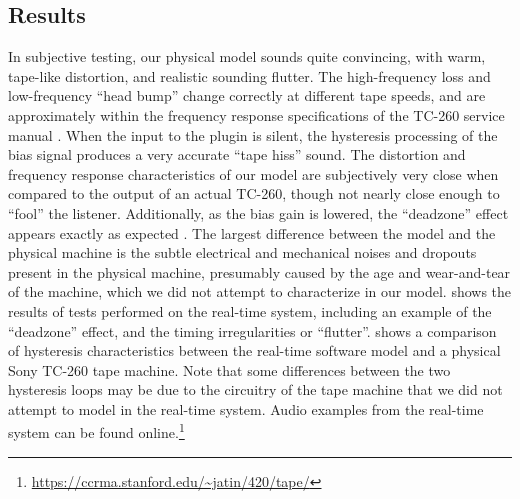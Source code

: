 \documentclass[twoside,a4paper]{article}
\begin{document}
\subsection{Results}
In subjective testing, our physical model sounds quite convincing,
with warm, tape-like distortion, and realistic sounding
flutter. The high-frequency loss and low-frequency
``head bump'' change correctly at different tape speeds,
and are approximately within the frequency response
specifications of the TC-260 service manual \cite{RefManual}.
When the input to the plugin is silent, the hysteresis processing
of the bias signal produces a very accurate ``tape hiss'' sound.
The distortion and frequency response characteristics
of our model are subjectively very close when compared to
the output of an actual TC-260, though not nearly close enough to 
``fool'' the listener. Additionally, as the bias
gain is lowered, the ``deadzone'' effect appears exactly
as expected \cite{Camras:1987:MRH:27189}.
The largest difference between the model and the physical
machine is the subtle electrical and mechanical noises
and dropouts present in the physical machine, presumably
caused by the age and wear-and-tear of the machine, which
we did not attempt to characterize in our model.
 shows the results
of tests performed on the real-time system, including
an example of the ``deadzone'' effect, and the timing
irregularities or ``flutter''.  shows
a comparison of hysteresis characteristics between
the real-time software model and a physical Sony TC-260
tape machine. Note that some
differences between the two hysteresis loops may be due
to the circuitry of the tape machine that we did not
attempt to model in the real-time system.
Audio examples from the real-time system can be found
online.\footnote{\url{https://ccrma.stanford.edu/~jatin/420/tape/}}
\end{document}
